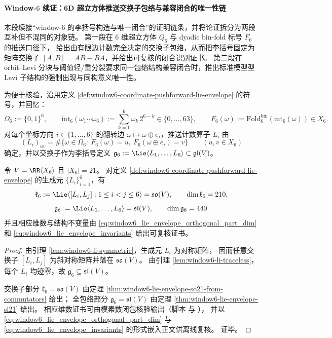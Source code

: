 
\paragraph{Window-\(6\) 续证：6D 超立方体推送交换子包络与兼容闭合的唯一性链}
本段续接“window-\(6\) 的李括号构造与唯一闭合”的证明链条，并将论证拆分为两段互补但不混同的对象链。
第一段在 \(6\) 维超立方体 \(Q_6\) 与 dyadic bin-fold 标号 \(F_6\) 的推送口径下，
给出由有限边计数完全决定的交换子包络，从而把李括号固定为矩阵交换子 \([A,B]=AB-BA\)，并给出可复核的闭合识别证书。
第二段在 orbit--Levi 分块与阈值轻/重分裂要求同一包络结构兼容闭合时，推出标准模型型 Levi 子结构的强制出现与同构意义唯一性。
\par
为便于核验，沿用定义 \ref{def:window6-coordinate-pushforward-lie-envelope} 的符号，并回忆：
\[
\Omega_6:=\{0,1\}^6,\qquad
\mathrm{int}_6(\omega_1\cdots\omega_6):=\sum_{k=1}^{6}\omega_k\,2^{6-k}\in\{0,\dots,63\},
\qquad
F_6(\omega):=\mathrm{Fold}^{\mathrm{bin}}_6(\mathrm{int}_6(\omega))\in X_6.
\]
对每个坐标方向 \(i\in\{1,\dots,6\}\) 的翻转边 \(\omega\mapsto \omega\oplus e_i\)，推送计数算子 \(L_i\) 由
\[
(L_i)_{uv}=\#\{\omega\in\Omega_6:\ F_6(\omega)=u,\ F_6(\omega\oplus e_i)=v\}\qquad (u,v\in X_6)
\]
确定，并以交换子作为李括号定义
\(
\mathfrak g_6:=\Lie\langle L_1,\dots,L_6\rangle\subset\mathfrak{gl}(V)
\)。

\begin{theorem}[推送交换子包络的可核验闭合]\label{thm:window6-push-envelope-certificate-upgrade}
令 \(V=\RR\langle X_6\rangle\) 且 \(|X_6|=21\)。
对定义 \ref{def:window6-coordinate-pushforward-lie-envelope} 的生成元 \(\{L_i\}_{i=1}^{6}\)，有
\[
\mathfrak{k}_6:=\Lie\langle [L_i,L_j]:1\le i<j\le 6\rangle=\mathfrak{so}(V),\qquad
\dim \mathfrak{k}_6=210,
\]
\[
\mathfrak{g}_6:=\Lie\langle L_1,\dots,L_6\rangle=\mathfrak{sl}(V),\qquad
\dim \mathfrak{g}_6=440.
\]
并且相应维数与结构不变量由
\eqref{eq:window6_lie_envelope_orthogonal_part_dim}
和
\eqref{eq:window6_lie_envelope_invariants}
给出可复核证书。
\end{theorem}
\begin{proof}
由引理 \ref{lem:window6-li-symmetric}，生成元 \(L_i\) 为对称矩阵，
因而任意交换子 \([L_i,L_j]\) 为斜对称矩阵并落在 \(\mathfrak{so}(V)\)。
由引理 \ref{lem:window6-li-traceless}，每个 \(L_i\) 均迹零，故 \(\mathfrak g_6\subseteq\mathfrak{sl}(V)\)。
\par
交换子部分 \(\mathfrak{k}_6=\mathfrak{so}(V)\) 由定理 \ref{thm:window6-lie-envelope-so21-from-commutators} 给出；
全包络部分 \(\mathfrak{g}_6=\mathfrak{sl}(V)\) 由定理 \ref{thm:window6-lie-envelope-sl21} 给出。
相应维数证书可由模素数闭包核验输出（脚本 \texttt{} 与 \texttt{}），
并以 \eqref{eq:window6_lie_envelope_orthogonal_part_dim} 与 \eqref{eq:window6_lie_envelope_invariants} 的形式嵌入正文供离线复核。
证毕。
\end{proof}

